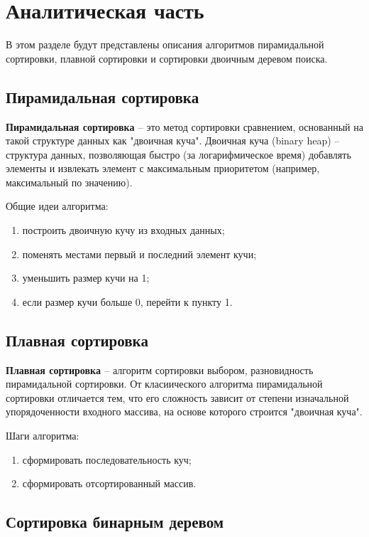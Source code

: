 \chapter{Аналитическая часть}
В этом разделе будут представлены описания алгоритмов пирамидальной сортировки, плавной сортировки и сортировки двоичным деревом поиска.

\section{Пирамидальная сортировка}

\textbf{Пирамидальная сортировка \cite{Knut}} -- это метод сортировки сравнением, основанный на такой структуре данных как "двоичная куча". Двоичная куча (binary heap) -- структура данных, позволяющая быстро (за логарифмическое время) добавлять элементы и извлекать элемент с максимальным приоритетом (например, максимальный по значению).


Общие идеи алгоритма:
\begin{enumerate}[label=\arabic*)]
	\item построить двоичную кучу из входных данных;
	\item поменять местами первый и последний элемент кучи;
	\item уменьшить размер кучи на 1;
	\item если размер кучи больше 0, перейти к пункту 1.
\end{enumerate}


\section{Плавная сортировка}

\textbf{Плавная сортировка \cite{Knut}} -- алгоритм сортировки выбором, разновидность пирамидальной сортировки. От класиического алгоритма пирамидальной сортировки отличается тем, что его сложность зависит от степени изначальной упорядоченности входного массива, на основе которого строится "двоичная куча".


Шаги алгоритма:
\begin{enumerate}[label=\arabic*)]
	\item сформировать последовательность куч;
	\item сформировать отсортированный массив.
\end{enumerate}

\section{Сортировка бинарным деревом}

